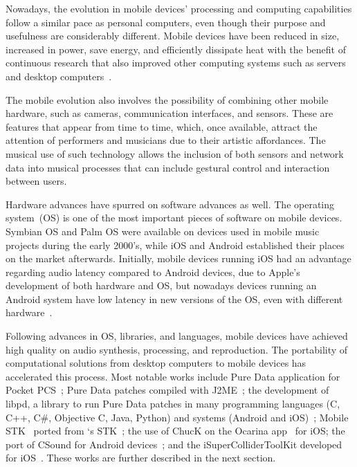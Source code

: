 Nowadays, the evolution in mobile devices' processing and computing capabilities follow a similar pace as personal computers, even though their purpose and usefulness are considerably different.
Mobile devices have been reduced in size, increased in power, save energy, and efficiently dissipate heat with the benefit of continuous research that also improved other computing systems such as servers and desktop computers~\citep{Barroso2007energy}.

The mobile evolution also involves the possibility of combining other mobile hardware, such as cameras, communication interfaces, and sensors. 
These are features that appear from time to time, which, once available, attract the attention of performers and musicians due to their artistic affordances.
The musical use of such technology allows the inclusion of both sensors and network data into musical processes that can include gestural control and interaction between users.

Hardware advances have spurred on software advances as well.
The operating system~(OS) is one of the most important pieces of software on mobile devices.
Symbian OS and Palm OS were available on devices used in mobile music projects during the early 2000's, while iOS and Android established their places on the market afterwards.
Initially, mobile devices running iOS had an advantage regarding audio latency compared to Android devices, due to Apple's development of both hardware and OS, but nowadays devices running an Android system have low latency in new versions of the OS, even with different hardware~\citep{Bianchi2012ontheperformance}.

Following advances in OS, libraries, and languages, mobile devices have achieved high quality on audio synthesis, processing, and reproduction.
The portability of computational solutions from desktop computers to mobile devices has accelerated this process.
Most notable works include Pure Data application for Pocket PCS~\citep{Geiger2003pda}; Pure Data patches compiled with J2ME~\citep{Schiemer2005pocketgamelan}; the development of libpd, a library to run Pure Data patches in many programming languages (C, C++, C\#, Objective C, Java, Python) and systems (Android and iOS)~\citep{Brinkmann2011embeddingpd}; Mobile STK~\citep{Essl2006mobilestk} ported from \citeauthor{Cook1999stk}`s STK~\citep{Cook1999stk}; the use of ChucK on the Ocarina app~\citep{Wang2008domobilephones} for iOS; the port of CSound for Android devices~\citep{Yi2012csound}; and the iSuperColliderToolKit developed for iOS~\citep{Ito2015isupercolliderkit}.
These works are further described in the next section.


